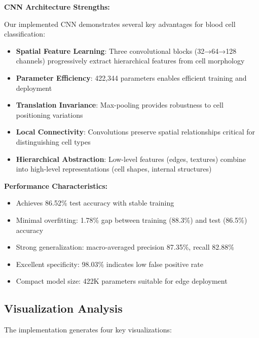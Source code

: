 \documentclass[runningheads]{llncs}
\begin{document}
\textbf{CNN Architecture Strengths:}

Our implemented CNN demonstrates several key advantages for blood cell classification:

\begin{itemize}
    \item \textbf{Spatial Feature Learning}: Three convolutional blocks (32→64→128 channels) progressively extract hierarchical features from cell morphology
    \item \textbf{Parameter Efficiency}: 422,344 parameters enables efficient training and deployment
    \item \textbf{Translation Invariance}: Max-pooling provides robustness to cell positioning variations
    \item \textbf{Local Connectivity}: Convolutions preserve spatial relationships critical for distinguishing cell types
    \item \textbf{Hierarchical Abstraction}: Low-level features (edges, textures) combine into high-level representations (cell shapes, internal structures)
\end{itemize}

\textbf{Performance Characteristics:}
\begin{itemize}
    \item Achieves 86.52\% test accuracy with stable training
    \item Minimal overfitting: 1.78\% gap between training (88.3\%) and test (86.5\%) accuracy
    \item Strong generalization: macro-averaged precision 87.35\%, recall 82.88\%
    \item Excellent specificity: 98.03\% indicates low false positive rate
    \item Compact model size: 422K parameters suitable for edge deployment
\end{itemize}

\subsection{Visualization Analysis}

The implementation generates four key visualizations:
\end{document}
